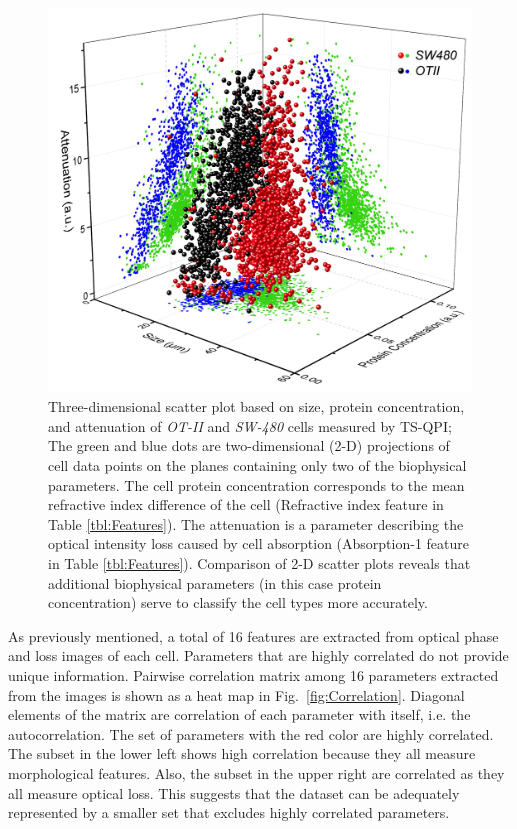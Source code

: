 \documentclass[aps,pra,reprint,superscriptaddress]{revtex4-1}
\begin{document}
\begin{figure}
\includegraphics[scale=0.2]{FigureOTSWScatter.jpg}
\caption{\label{fig:OTSWScatter} Three-dimensional scatter plot based on size, protein concentration, and attenuation of \textit{OT-II} and \textit{SW-480} cells measured by TS-QPI; The green and blue dots are two-dimensional (2-D) projections of cell data points on the planes containing only two of the biophysical parameters. The cell protein concentration corresponds to the mean refractive index difference of the cell (Refractive index feature in Table \ref{tbl:Features}). The attenuation is a parameter describing the optical intensity loss caused by cell absorption (Absorption-1 feature in Table \ref{tbl:Features}). Comparison of 2-D scatter plots reveals that additional biophysical parameters (in this case protein concentration) serve to classify the cell types more accurately.}
\end{figure}

As previously mentioned, a total of 16 features are extracted from optical phase and loss images of each cell. Parameters that are highly correlated do not provide unique information. Pairwise correlation matrix among 16 parameters extracted from the images is shown as a heat map in Fig.~\ref{fig:Correlation}. Diagonal elements of the matrix are correlation of each parameter with itself, i.e. the autocorrelation. The set of parameters with the red color are highly correlated. The subset in the lower left shows high correlation because they all measure morphological features. Also, the subset in the upper right are correlated as they all measure optical loss. This suggests that the dataset can be adequately represented by a smaller set that excludes highly correlated parameters.
\end{document}
